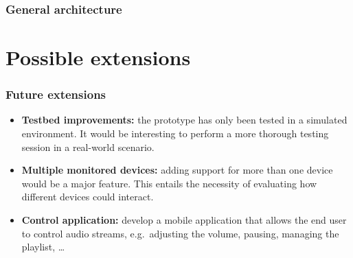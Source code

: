\documentclass{beamer}
\begin{document}
\begin{frame}
\frametitle{General architecture}
\begin{center}
\end{center}
\end{frame}


\section{Possible extensions}

\begin{frame}
\frametitle{Future extensions}
\begin{itemize}
	\item \textbf{Testbed improvements:} the prototype has only been tested in a simulated environment. It would be interesting to perform a more thorough testing session in a real-world scenario.
	\pause
	\item \textbf{Multiple monitored devices:} adding support for more than one device would be a major feature. This entails the necessity of evaluating how different devices could interact.
	\pause
	\item \textbf{Control application:} develop a mobile application that allows the end user to control audio streams, e.g.\ adjusting the volume, pausing, managing the playlist, \ldots
\end{itemize}
\end{frame}
\end{document}
